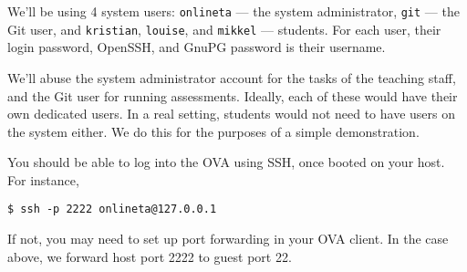 

We'll be using 4 system users: \texttt{onlineta} --- the system administrator,
\texttt{git} --- the Git user, and \texttt{kristian}, \texttt{louise}, and
\texttt{mikkel} --- students. For each user, their login password, OpenSSH, and
GnuPG password is their username.

We'll abuse the system administrator account for the tasks of the teaching
staff, and the Git user for running assessments. Ideally, each of these would
have their own dedicated users. In a real setting, students would not need to
have users on the system either. We do this for the purposes of a simple
demonstration.

You should be able to log into the OVA using SSH, once booted on your host.
For instance,

\begin{lstlisting}
$ ssh -p 2222 onlineta@127.0.0.1
\end{lstlisting}

If not, you may need to set up port forwarding in your OVA client. In the case
above, we forward host port 2222 to guest port 22.


